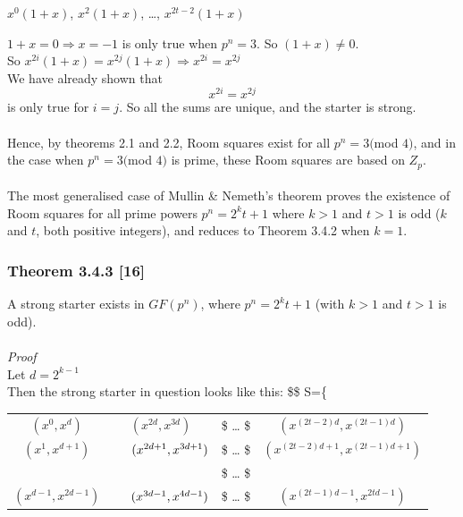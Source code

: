\documentclass[
  12pt,
  a4paper]{book}
\begin{document}
\(x^0(1+x)\), \(x^2(1+x)\), \ldots, \(x^{2t-2}(1+x)\)

\(1+x=0 \Rightarrow x = -1\) is only true when \(p^n=3\). So
\((1+x) \neq 0\).\\
So \(x^{2i}(1+x)=x^{2j}(1+x) \Rightarrow x^{2i}=x^{2j}\)\\
We have already shown that \[x^{2i}=x^{2j}\] is only true for \(i=j\).
So all the sums are unique, and the starter is strong.\\
~\\
Hence, by theorems 2.1 and 2.2, Room squares exist for all \(p^n=3(\)mod
\(4)\), and in the case when \(p^n=3(\)mod \(4)\) is prime, these Room
squares are based on \(Z_p\).\\
~\\
The most generalised case of Mullin \& Nemeth's theorem proves the
existence of Room squares for all prime powers \(p^n=2^kt+1\) where
\(k>1\) and \(t>1\) is odd (\(k\) and \(t\), both positive integers),
and reduces to Theorem 3.4.2 when \(k=1\).

\hypertarget{theorem-3.4.3-16}{%
\subsubsection{Theorem 3.4.3 {[}16{]}}\label{theorem-3.4.3-16}}

A strong starter exists in \(GF(p^n)\), where \(p^n=2^kt+1\) (with
\(k>1\) and \(t>1\) is odd).\\
~\\
\emph{Proof}\\
Let \(d=2^{k-1}\)\\
Then the strong starter in question looks like this: \$\$ S=\{

\begin{longtable}[]{@{}cccc@{}}
\toprule
\endhead
\((x^0,x^d)\) & \((x^{2d},x^{3d})\) & \$ \hspace{0.5cm} \ldots{}
\hspace{0.5cm} \$ & \((x^{(2t-2)d},x^{(2t-1)d})\)\tabularnewline
\((x^1,x^{d+1})\) & \(\hspace{0.5cm}(x^{2d+1},x^{3d+1})\) & \$
\hspace{0.5cm} \ldots{} \hspace{0.5cm} \$ &
\((x^{(2t-2)d+1},x^{(2t-1)d+1})\)\tabularnewline
& & \$ \hspace{0.5cm} \ldots{} \hspace{0.5cm} \$ &\tabularnewline
\((x^{d-1},x^{2d-1})\) & \(\hspace{0.5cm}(x^{3d-1},x^{4d-1})\) & \$
\hspace{0.5cm} \ldots{} \hspace{0.5cm} \$ &
\((x^{(2t-1)d-1},x^{2td-1})\)\tabularnewline
\bottomrule
\end{longtable}
\end{document}
